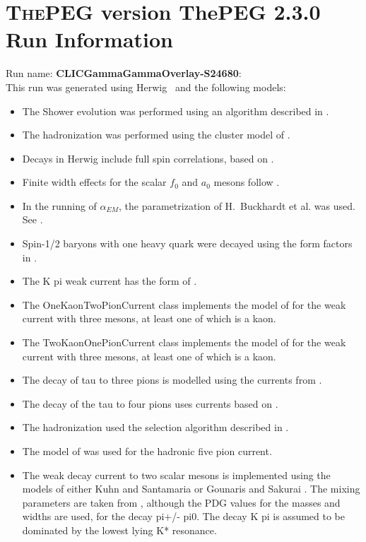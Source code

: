 \documentclass{article}
\begin{document}
\appendix
\section[xxx]{\textsc{ThePEG} version ThePEG 2.3.0 \cite{ThePEG} Run Information}
Run name: \textbf{CLICGammaGammaOverlay-S24680}:\\
This run was generated using Herwig~\cite{Bahr:2008pv} and the following models:
\begin{itemize}
\item The Shower evolution was performed using an algorithm described in \cite{Bahr:2008pv,Marchesini:1983bm,Marchesini:1987cf,Gieseke:2003rz,Masouminia:2021kne}.
\item The hadronization was performed using the cluster model of \cite{Webber:1983if}.
\item Decays in Herwig include full spin correlations, based on \cite{Richardson:2001df}.
\item Finite width effects for the scalar $f_0$ and $a_0$ mesons follow \cite{Flatte:1976xu}.
\item In the running of $\alpha_{EM}$, the parametrization of H.~Buckhardt et al. was used. See \cite{KLEISSCERN9808v3pp129}.
\item Spin-1/2 baryons with one heavy quark were decayed using the form factors in \cite{Singleton:1990ye}.
\item The K pi weak current has the form of \cite{Finkemeier:1996dh}.
\item The OneKaonTwoPionCurrent class implements the model of \cite{Finkemeier:1995sr} for the weak current with three mesons, at least one of which is a kaon.
\item The TwoKaonOnePionCurrent class implements the model of \cite{Finkemeier:1995sr} for the weak current with three mesons, at least one of which is a kaon.
\item The decay of tau to three pions is modelled using the currents from \cite{Asner:1999kj}.
\item The decay of the tau to four pions uses currents based on \cite{Bondar:2002mw}.
\item The hadronization used the selection algorithm described in \cite{Kupco:1998fx}.
\item The model of \cite{Kuhn:2006nw} was used for the hadronic five pion current.
\item The weak decay current to two scalar mesons is implemented using the models of either Kuhn and Santamaria \cite{Kuhn:1990ad} or Gounaris and Sakurai \cite{Gounaris:1968mw}. The mixing parameters are taken from \cite{Asner:1999kj}, although the PDG values for the masses and widths are used, for the decay pi+/- pi0. The decay K pi is assumed to  be dominated by the lowest lying K* resonance.

\end{itemize}
\end{document}

